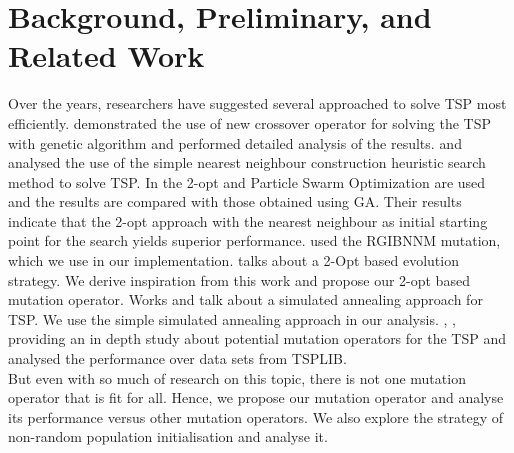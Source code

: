 \documentclass{article}
\begin{document}
\section{Background, Preliminary, and Related Work}
Over the years, researchers have suggested several approached to solve TSP most efficiently.
\cite{hussain2017genetic} demonstrated the use of new crossover operator for solving the TSP with genetic algorithm and performed detailed analysis of the results. \cite{hurkens2004nearest} and \cite{hougardy2015nearest} analysed the use of the simple nearest neighbour construction heuristic search method to solve TSP. 
In \cite{article} the 2-opt and Particle Swarm Optimization are used and the
results are compared with those obtained using GA. Their results indicate that the 2-opt approach with the nearest neighbour as initial starting point for the search yields superior performance.
\cite{alkafaween2018improving} used the RGIBNNM mutation, which we use in our implementation. 
\cite{karagul2016using} talks about a 2-Opt based evolution strategy. We derive inspiration from this work and propose our 2-opt based mutation operator.
Works \cite{ezugwu2017simulated} and \cite{zhan2016list} talk about a simulated annealing approach for TSP. We use the simple simulated annealing approach in our analysis.
\cite{albayrak2011development}, \cite{chieng2014performance}, \cite{abdoun2012analyzing} providing an in depth study about potential mutation operators for the TSP and analysed the performance over data sets from TSPLIB.
\\But even with so much of research on this topic, there is not one mutation operator that is fit for all. Hence, we propose our mutation operator and analyse its performance versus other mutation operators. We also explore the strategy of non-random population initialisation and analyse it.
\end{document}
